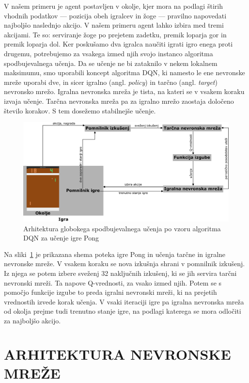 \documentclass[cover]{thesis}
\begin{document}
V našem primeru je agent postavljen v okolje, kjer mora na podlagi štirih vhodnih podatkov --- pozicija obeh igralcev in žoge --- pravilno napovedati najboljšo naslednjo akcijo. V našem primeru agent lahko izbira med tremi akcijami. Te so: serviranje žoge po prejetem zadetku, premik loparja gor in premik loparja dol. Ker poskušamo dva igralca naučiti igrati igro enega proti drugemu, potrebujemo za vsakega izmed njih svojo instanco algoritma spodbujevalnega učenja. Da se učenje ne bi zataknilo v nekem lokalnem maksimumu, smo uporabili koncept algoritma DQN, ki namesto le ene nevronske mreže uporabi dve, in sicer igralno (angl. \emph{policy}) in tarčno (angl. \emph{target}) nevronsko mrežo. Igralna nevronska mreža je tista, na kateri se v vsakem koraku izvaja učenje. Tarčna nevronska mreža pa za igralno mrežo zaostaja določeno število korakov. S tem dosežemo stabilnejše učenje.

\begin{figure}[H]
    \includegraphics[width=\textwidth]{NNgameScheme.png}
    \caption{Arhitektura globokega spodbujevalnega učenja po vzoru algoritma DQN za učenje igre Pong}\label{fig:gameScheme}
\end{figure}
Na sliki~\ref{fig:gameScheme} je prikazana shema poteka igre Pong in učenja tarčne in igralne nevronske mreže. V vsakem koraku se nova izkušnja shrani v pomnilnik izkušenj. Iz njega se potem izbere sveženj 32 naključnih izkušenj, ki se jih servira tarčni nevronski mreži. Ta napove Q-vrednosti, za vsako izmed njih. Potem se s pomočjo funkcije izgube to preda igralni nevronski mreži, ki na prejetih vrednostih izvede korak učenja. V vsaki iteraciji igre pa igralna nevronska mreža od okolja prejme tudi trenutno stanje igre, na podlagi katerega se mora odločiti za najboljšo akcijo.

\section{ARHITEKTURA NEVRONSKE MREŽE}\label{section:nnarchitecture}
\end{document}
